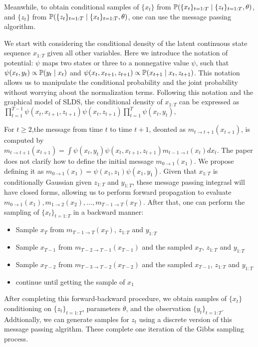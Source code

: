Meanwhile, to obtain conditional samples of $\{x_t\}$ from $\mathbb{P}(\{x_{t}\}_{t=1:T} \mid \{z_t\}_{t=1:T}, \theta)$, and $\{z_t\}$ from $\mathbb{P}(\{z_{t}\}_{t=1:T} \mid \{x_t\}_{t=1:T}, \theta)$, one can use the message passing algorithm.

We start with considering the  conditional  density  of  the  latent continuous  state  sequence $x_{1:T}$ given  all  other  variables. Here we introduce the notation of potential: $\psi$ maps two states or three to a nonnegative value $\psi$, such that $\psi(x_t,y_t)\propto \mathbb{P}(y_t \mid x_t)$ and $\psi(x_t,x_{t+1},z_{t+1})\propto \mathbb{P}(x_{t+1} \mid x_t,z_{t+1})$. This notation allows us to manipulate the conditional probability and the joint probability without worrying about the normalization terms. Following this notation and the graphical model of SLDS, the conditional density of $x_{1:T}$ can be expressed as $
\prod_{t=1}^{T-1} \psi\left(x_{t}, x_{t+1}, z_{t+1}\right) \psi\left(x_{t}, z_{t+1}\right) \prod_{t=1}^{T} \psi\left(x_{t}, y_{t}\right),
$

 
For $t\geq 2$,the message from time $t$ to time $t+1$, deonted as $m_{t \rightarrow t+1}(x_{t+1})$, is computed by 
$ m_{t \rightarrow t+1}(x_{t+1})=\int \psi(x_t,y_t) \psi(x_t,x_{t+1},z_{t+1}) m_{t-1 \rightarrow t}(x_t) dx_t $. The paper does not clarify how to define the initial message $m_{0 \rightarrow 1}(x_1)$. We propose defining it as $m_{0 \rightarrow 1}(x_1)=\psi\left(x_{1}, z_{1}\right) \psi\left(x_{1}, y_{1}\right)$. Given that $x_{1:T}$ is  conditionally Gaussian given $z_{1:T}$ and $y_{1:T}$, these message passing integrasl will have closed forms, allowing us to perform forward propagation to evaluate $m_{0 \rightarrow 1}(x_1), m_{1 \rightarrow 2}(x_2),\dots, m_{T-1 \rightarrow T}(x_T)$. After that, one can perform the sampling of $\{x_t\}_{t=1:T}$ in a backward manner: 
\begin{itemize}
  \item Sample $x_T$ from $m_{T-1 \rightarrow T}(x_T)$, $z_{1:T}$ and $y_{1:T}$
  \item Sample $x_{T-1}$ from $m_{T-2 \rightarrow T-1}(x_{T-1})$ and the sampled $x_T$, $z_{1:T}$ and $y_{1:T}$
  \item Sample $x_{T-2}$ from $m_{T-3 \rightarrow T-2}(x_{T-2})$ and the sampled $x_{T-1}$, $z_{1:T}$ and $y_{1:T}$
  \item continue until getting the sample of $x_1$
\end{itemize}
After completing this forward-backward procedure, we obtain samples of $\{x_t\}$ conditioning on $\{z_t\}_{t=1:T}$, parameters $\theta$, and the observation $\{y_t\}_{t=1:T}$. Addtionally, we can generate samples for $z_t$ using a discrete version of this message passing algrithm. These complete one iteration of the Gibbs sampling process.


